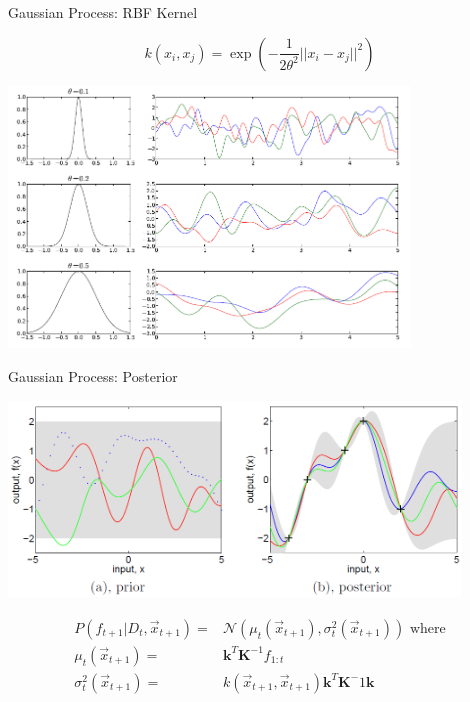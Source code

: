 \begin{frame}[c]{Gaussian Process: RBF Kernel}

\begin{equation}
k(x_i,x_j) = \exp \left(- \frac{1}{2\theta^2} || x_i - x_j ||^2 \right) \nonumber
\end{equation}

\centering
\includegraphics[width=0.8\textwidth]{images/gp_rbf_kernel.png}

\end{frame}
\begin{frame}[c]{Gaussian Process: Posterior}

\centering
\includegraphics[width=0.9\textwidth]{images/gp_postrior.png}


\begin{eqnarray}
P(f_{t+1} | D_t, \vec{x}_{t+1})  =& \mathcal{N}(\mu_t(\vec{x}_{t+1}),\sigma_t^2(\vec{x}_{t+1})) \text{ where} \nonumber\\ 
\mu_t(\vec{x}_{t+1})  =& \mathbf{k}^T\mathbf{K}^{-1}f_{1:t} \nonumber \\ 
\sigma_t^2(\vec{x}_{t+1}) =& k(\vec{x}_{t+1},\vec{x}_{t+1}) \nonumber \mathbf{k}^T\mathbf{K}^-1\mathbf{k}
\end{eqnarray}

\end{frame}
